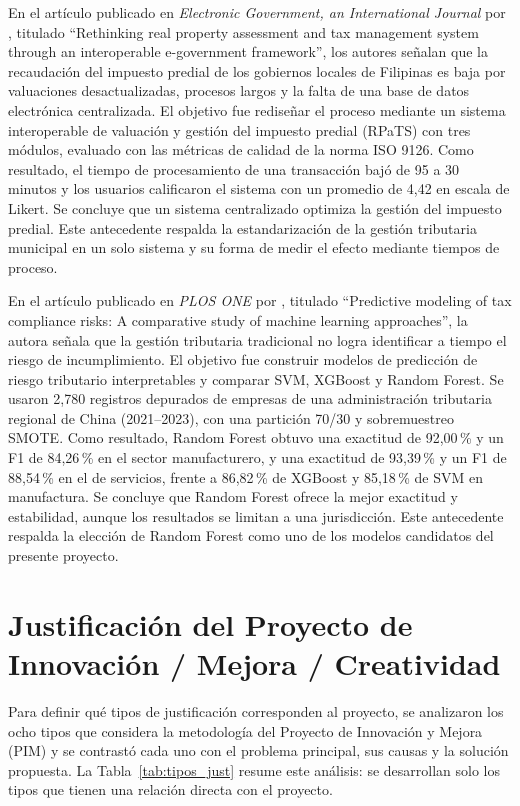 \documentclass[12pt,a4paper]{report}
\begin{document}
En el artículo publicado en \textit{Electronic Government, an International Journal} por \textcite{omorog2022}, titulado ``Rethinking real property assessment and tax management system through an interoperable e-government framework'', los autores señalan que la recaudación del impuesto predial de los gobiernos locales de Filipinas es baja por valuaciones desactualizadas, procesos largos y la falta de una base de datos electrónica centralizada. El objetivo fue rediseñar el proceso mediante un sistema interoperable de valuación y gestión del impuesto predial (RPaTS) con tres módulos, evaluado con las métricas de calidad de la norma ISO 9126. Como resultado, el tiempo de procesamiento de una transacción bajó de 95 a 30 minutos y los usuarios calificaron el sistema con un promedio de 4,42 en escala de Likert. Se concluye que un sistema centralizado optimiza la gestión del impuesto predial. Este antecedente respalda la estandarización de la gestión tributaria municipal en un solo sistema y su forma de medir el efecto mediante tiempos de proceso.

En el artículo publicado en \textit{PLOS ONE} por \textcite{yang2025}, titulado ``Predictive modeling of tax compliance risks: A comparative study of machine learning approaches'', la autora señala que la gestión tributaria tradicional no logra identificar a tiempo el riesgo de incumplimiento. El objetivo fue construir modelos de predicción de riesgo tributario interpretables y comparar SVM, XGBoost y Random Forest. Se usaron 2,780 registros depurados de empresas de una administración tributaria regional de China (2021--2023), con una partición 70/30 y sobremuestreo SMOTE. Como resultado, Random Forest obtuvo una exactitud de 92,00\,\% y un F1 de 84,26\,\% en el sector manufacturero, y una exactitud de 93,39\,\% y un F1 de 88,54\,\% en el de servicios, frente a 86,82\,\% de XGBoost y 85,18\,\% de SVM en manufactura. Se concluye que Random Forest ofrece la mejor exactitud y estabilidad, aunque los resultados se limitan a una jurisdicción. Este antecedente respalda la elección de Random Forest como uno de los modelos candidatos del presente proyecto.

\section{Justificación del Proyecto de Innovación / Mejora / Creatividad}

Para definir qué tipos de justificación corresponden al proyecto, se analizaron los ocho tipos que considera la metodología del Proyecto de Innovación y Mejora (PIM) y se contrastó cada uno con el problema principal, sus causas y la solución propuesta. La Tabla~\ref{tab:tipos_just} resume este análisis: se desarrollan solo los tipos que tienen una relación directa con el proyecto.
\end{document}
